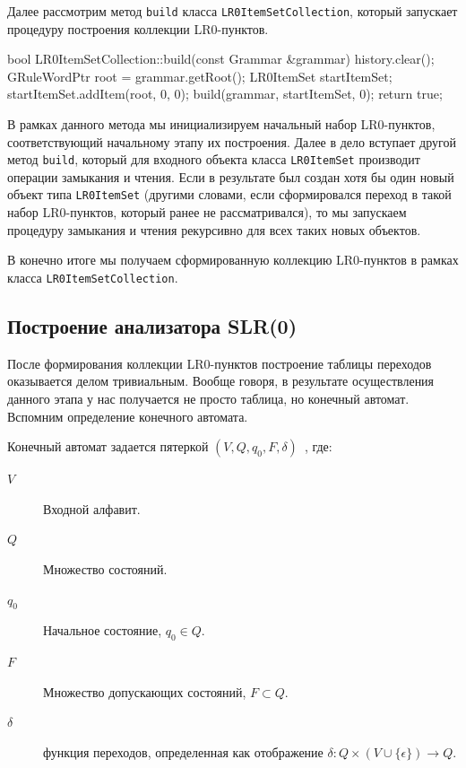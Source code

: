 Далее рассмотрим метод \lstinline{build} класса \lstinline{LR0ItemSetCollection}, который запускает процедуру построения коллекции LR0-пунктов.
\begin{Verb}
bool LR0ItemSetCollection::build(const Grammar &grammar) {
    history.clear();
    GRuleWordPtr root = grammar.getRoot();
    LR0ItemSet startItemSet;
    startItemSet.addItem({root, 0, 0});
    build(grammar, startItemSet, 0);
    return true;
}
\end{Verb}
В рамках данного метода мы инициализируем начальный набор LR0-пунктов, соответствующий начальному этапу их построения. Далее в дело вступает другой метод \lstinline{build}, который для входного объекта класса \lstinline{LR0ItemSet} производит операции замыкания и чтения. Если в результате был создан хотя бы один новый объект типа \lstinline{LR0ItemSet} (другими словами, если сформировался переход в такой набор LR0-пунктов, который ранее не рассматривался), то мы запускаем процедуру замыкания и чтения рекурсивно для всех таких новых объектов.

В конечно итоге мы получаем сформированную коллекцию LR0-пунктов в рамках класса \lstinline{LR0ItemSetCollection}.

\subsection{Построение анализатора SLR(0)}
После формирования коллекции LR0-пунктов построение таблицы переходов оказывается делом тривиальным. Вообще говоря, в результате осуществления данного этапа у нас получается не просто таблица, но конечный автомат. Вспомним определение конечного автомата.
\begin{mydefinition}
Конечный автомат задается пятеркой $(V, Q, q_0, F, \delta)$~\autocite{automation}, где:
\begin{description}
  \item[$V$] Входной алфавит.
  \item[$Q$] Множество состояний.
  \item[$q_0$] Начальное состояние, $q_0 \in Q$.
  \item[$F$] Множество допускающих состояний, $F \subset Q$.
  \item[$\delta$] функция переходов, определенная как отображение $\delta: Q \times (V \cup \{\epsilon\}) \rightarrow Q$.
\end{description}
\end{mydefinition}

